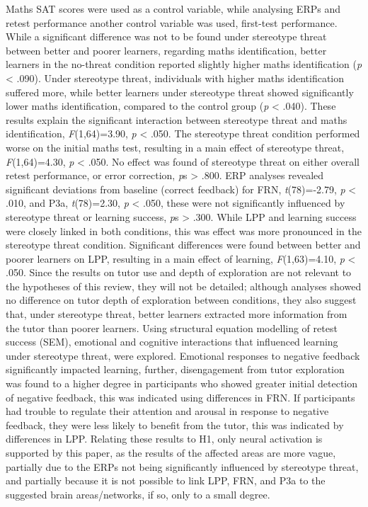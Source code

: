 \documentclass[
  stu]{apa7}
\begin{document}
Maths SAT scores were used as a control variable, while analysing ERPs and retest performance another control variable was used, first-test performance.\\
While a significant difference was not to be found under stereotype threat between better and poorer learners, regarding maths identification, better learners in the no-threat condition reported slightly higher maths identification (\emph{p} \textless{} .090).
Under stereotype threat, individuals with higher maths identification suffered more, while better learners under stereotype threat showed significantly lower maths identification, compared to the control group (\emph{p} \textless{} .040).
These results explain the significant interaction between stereotype threat and maths identification, \emph{F}(1,64)=3.90, \emph{p} \textless{} .050.
The stereotype threat condition performed worse on the initial maths test, resulting in a main effect of stereotype threat, \emph{F}(1,64)=4.30, \emph{p} \textless{} .050.
No effect was found of stereotype threat on either overall retest performance, or error correction, \emph{p}s \textgreater{} .800.
ERP analyses revealed significant deviations from baseline (correct feedback) for FRN, \emph{t}(78)=-2.79, \emph{p} \textless{} .010, and P3a, \emph{t}(78)=2.30, \emph{p} \textless{} .050, these were not significantly influenced by stereotype threat or learning success, \emph{p}s \textgreater{} .300.
While LPP and learning success were closely linked in both conditions, this was effect was more pronounced in the stereotype threat condition.
Significant differences were found between better and poorer learners on LPP, resulting in a main effect of learning, \emph{F}(1,63)=4.10, \emph{p} \textless{} .050.
Since the results on tutor use and depth of exploration are not relevant to the hypotheses of this review, they will not be detailed; although analyses showed no difference on tutor depth of exploration between conditions, they also suggest that, under stereotype threat, better learners extracted more information from the tutor than poorer learners.
Using structural equation modelling of retest success (SEM), emotional and cognitive interactions that influenced learning under stereotype threat, were explored.
Emotional responses to negative feedback significantly impacted learning, further, disengagement from tutor exploration was found to a higher degree in participants who showed greater initial detection of negative feedback, this was indicated using differences in FRN.
If participants had trouble to regulate their attention and arousal in response to negative feedback, they were less likely to benefit from the tutor, this was indicated by differences in LPP.
Relating these results to H1, only neural activation is supported by this paper, as the results of the affected areas are more vague, partially due to the ERPs not being significantly influenced by stereotype threat, and partially because it is not possible to link LPP, FRN, and P3a to the suggested brain areas/networks, if so, only to a small degree.
\end{document}
